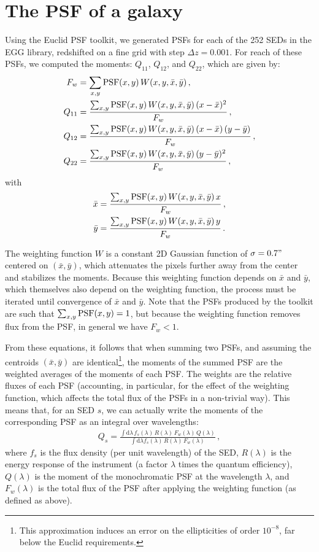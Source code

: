 \documentclass[11pt,a4paper]{article}
\newcommand{\dd}{\mathrm{d}}
\numberwithin{equation}{section}
\begin{document}
\section{The PSF of a galaxy}

Using the Euclid PSF toolkit, we generated PSFs for each of the 252 SEDs in the EGG library, redshifted on a fine grid with step $\Delta z = 0.001$. For reach of these PSFs, we computed the moments: $Q_{11}$, $Q_{12}$, and $Q_{22}$, which are given by:
\begin{align}
F_w &= \sum_{x, y} {\rm PSF}(x,y)\,W(x,y,\bar{x},\bar{y})\,, \\
Q_{11} &= \frac{\sum_{x, y} {\rm PSF}(x,y)\,W(x,y,\bar{x},\bar{y})\,(x - \bar{x})^2}{F_w}\,, \\
Q_{12} &= \frac{\sum_{x, y} {\rm PSF}(x,y)\,W(x,y,\bar{x},\bar{y})\,(x - \bar{x})\,(y - \bar{y})}{F_w}\,, \\
Q_{22} &= \frac{\sum_{x, y} {\rm PSF}(x,y)\,W(x,y,\bar{x},\bar{y})\,(y - \bar{y})^2}{F_w}\,, \\
\end{align}
with
\begin{align}
\bar{x} &= \frac{\sum_{x, y} {\rm PSF}(x,y)\,W(x,y,\bar{x},\bar{y})\,x}{F_w}\,, \\
\bar{y} &= \frac{\sum_{x, y} {\rm PSF}(x,y)\,W(x,y,\bar{x},\bar{y})\,y}{F_w}\,.
\end{align}

The weighting function $W$ is a constant 2D Gaussian function of $\sigma=0.7"$ centered on $(\bar{x}, \bar{y})$, which attenuates the pixels further away from the center and stabilizes the moments. Because this weighting function depends on $\bar{x}$ and $\bar{y}$, which themselves also depend on the weighting function, the process must be iterated until convergence of $\bar{x}$ and $\bar{y}$. Note that the PSFs produced by the toolkit are such that $\sum_{x,y}{\rm PSF}(x,y) = 1$, but because the weighting function removes flux from the PSF, in general we have $F_w < 1$.

From these equations, it follows that when summing two PSFs, and assuming the centroids $(\bar{x},\bar{y})$ are identical\footnote{This approximation induces an error on the ellipticities of order $10^{-8}$, far below the Euclid requirements.}, the moments of the summed PSF are the weighted averages of the moments of each PSF. The weights are the relative fluxes of each PSF (accounting, in particular, for the effect of the weighting function, which affects the total flux of the PSFs in a non-trivial way). This means that, for an SED $s$, we can actually write the moments of the corresponding PSF as an integral over wavelengths:
\begin{align}
Q_s = \frac{\int \dd\lambda\,f_s(\lambda)\,R(\lambda)\,F_w(\lambda)\,Q(\lambda)}{\int \dd\lambda f_s(\lambda)\,R(\lambda)\,F_w(\lambda)}\,,
\end{align}
where $f_s$ is the flux density (per unit wavelength) of the SED, $R(\lambda)$ is the energy response of the instrument (a factor $\lambda$ times the quantum efficiency), $Q(\lambda)$ is the moment of the monochromatic PSF at the wavelength $\lambda$, and $F_w(\lambda)$ is the total flux of the PSF after applying the weighting function (as defined as above).
\end{document}
